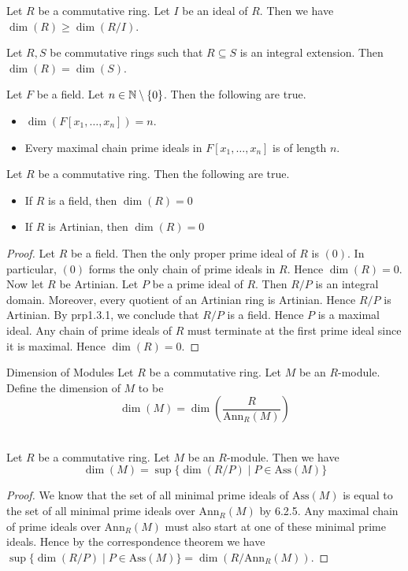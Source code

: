 \documentclass[a4paper]{article}
\begin{document}
\begin{lmm}{}{} Let $R$ be a commutative ring. Let $I$ be an ideal of $R$. Then we have $\dim(R)\geq\dim(R/I)$. 
\end{lmm}

\begin{lmm}{}{} Let $R,S$ be commutative rings such that $R\subseteq S$ is an integral extension. Then $\dim(R)=\dim(S)$. 
\end{lmm}

\begin{prp}{}{} Let $F$ be a field. Let $n\in\mathbb{N}\setminus\{0\}$. Then the following are true. 
\begin{itemize}
\item $\dim(F[x_1,\dots,x_n])=n$. 
\item Every maximal chain prime ideals in $F[x_1,\dots,x_n]$ is of length $n$. 
\end{itemize}
\end{prp}

\begin{lmm}{}{} Let $R$ be a commutative ring. Then the following are true. 
\begin{itemize}
\item If $R$ is a field, then $\dim(R)=0$
\item If $R$ is Artinian, then $\dim(R)=0$
\end{itemize} 
\begin{proof}
Let $R$ be a field. Then the only proper prime ideal of $R$ is $(0)$. In particular, $(0)$ forms the only chain of prime ideals in $R$. Hence $\dim(R)=0$. \\

Now let $R$ be Artinian. Let $P$ be a prime ideal of $R$. Then $R/P$ is an integral domain. Moreover, every quotient of an Artinian ring is Artinian. Hence $R/P$ is Artinian. By prp1.3.1, we conclude that $R/P$ is a field. Hence $P$ is a maximal ideal. Any chain of prime ideals of $R$ must terminate at the first prime ideal since it is maximal. Hence $\dim(R)=0$. 
\end{proof}
\end{lmm}

\begin{defn}{Dimension of Modules}{} Let $R$ be a commutative ring. Let $M$ be an $R$-module. Define the dimension of $M$ to be $$\dim(M)=\dim\left(\frac{R}{\text{Ann}_R(M)}\right)$$
\end{defn}

\begin{prp}{}{}\\
Let $R$ be a commutative ring. Let $M$ be an $R$-module. Then we have $$\dim(M)=\sup\{\dim(R/P)\;|\;P\in\text{Ass}(M)\}$$
\begin{proof}
We know that the set of all minimal prime ideals of $\text{Ass}(M)$ is equal to the set of all minimal prime ideals over $\text{Ann}_R(M)$ by 6.2.5. Any maximal chain of prime ideals over $\text{Ann}_R(M)$ must also start at one of these minimal prime ideals. Hence by the correspondence theorem we have $\sup\{\dim(R/P)\;|\;P\in\text{Ass}(M)\}=\dim(R/\text{Ann}_R(M))$. 
\end{proof}
\end{prp}
\end{document}
